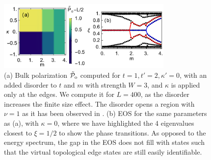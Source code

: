 \documentclass[twocolumn,amsmath,longbibliography,amssymb,superscriptaddress]{revtex4-1}
\newcommand{\tpo}{\tilde{\mathcal{P}}_{\rm o}}
\begin{document}
\begin{figure}[t]
\includegraphics[width=86mm]{fig8comp.pdf}
\caption{(a) Bulk polarization $\tpo$ computed for $t=1,t'=2,\kappa'=0$, with an added disorder to $t$ and $m$ with strength $W=3$, and $\kappa$ is applied only at the edges. We compute it for $L=400$, as the disorder increases the finite size  effect. The disorder opens a region with $\nu=1$ as it has been observed in \cite{Song2014}. (b) EOS for the same parameters as (a), with $\kappa=0$, where we have highlighted the 4 eigenvalues closest to $\xi = 1/2$ to show the phase transitions. As opposed to the energy spectrum, the gap in the EOS does not fill with states such that the virtual topological edge states are still easily identifiable.  }
	\label{disorder_chern}
\end{figure}
\end{document}
